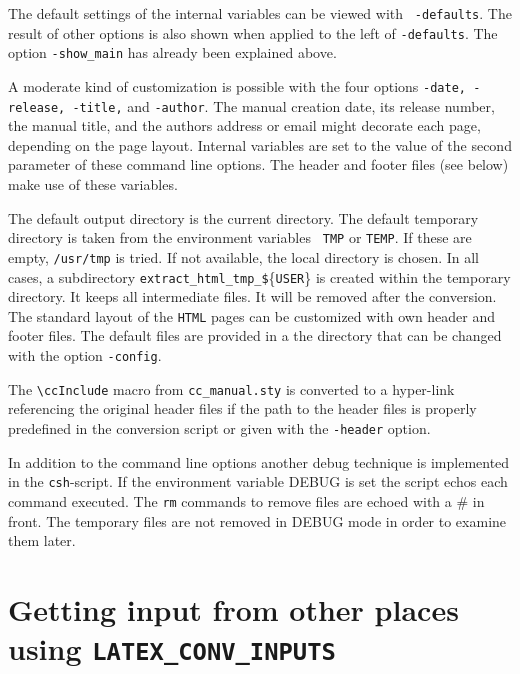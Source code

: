 \documentclass[11pt]{article}
\makeatletter
\newcommand{\TTindex}[1]{\index{#1@{\tt #1}}}
\makeatother
\begin{document}
\TTindex{TMP}\TTindex{TEMP} 

The default settings of the internal variables can be viewed with {\tt
  -defaults}. The result of other options is also shown when applied
to the left of {\tt -defaults}. The option {\tt -show\_main} has
already been explained above.

A moderate kind of customization is possible with the four options
{\tt -date, -release, -title,} and {\tt -author}. The manual creation
date, its release number, the manual title, and the authors address or
email might decorate each page, depending on the page layout.
Internal variables are set to the value of the second parameter of
these command line options.  The header and footer files (see below)
make use of these variables.

The default output directory is the current directory.  The default
temporary directory is taken from the environment variables {\tt
  TMP} or {\tt TEMP}. If these are empty, {\tt /usr/tmp} is tried. If
not available, the local directory is chosen. In all cases, a
subdirectory {\tt extract\_html\_tmp\_\$}\{{\tt USER}\} is created within
the temporary directory.  It keeps all intermediate files. It will be
removed after the conversion.  The standard layout of the {\tt HTML}
pages can be customized with own header and footer files. The default
files are provided in a the directory that can be changed with the
option {\tt -config}.

The \verb+\ccInclude+ macro from {\tt cc\_manual.sty} is converted to a
hyper-link referencing the original header files if the path to the
header files is properly predefined in the conversion script or given
with the {\tt -header} option.

\TTindex{DEBUG} 
In addition to the command line options another debug technique is
implemented in the {\tt csh}-script. If the environment variable DEBUG
is set the script echos each command executed. The {\tt rm} commands
to remove files are echoed with a \# in front. The temporary files are
not removed in DEBUG mode in order to examine them later.

\section{Getting input from other places using {\tt LATEX\_CONV\_INPUTS}} 
\label{sectionLatexConvInputs}
\end{document}
